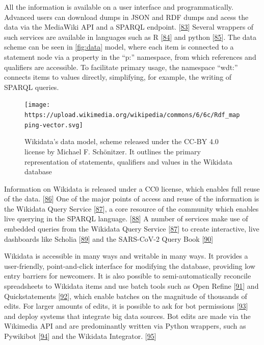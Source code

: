 All the information is available on a user interface and programmatically.
Advanced users can download dumps in JSON and RDF dumps and acess the data via the MediaWiki API and a SPARQL endpoint. {[}\protect\hyperlink{ref-4wSLyAPr}{83}{]}
Several wrappers of such services are available in languages such as R {[}\protect\hyperlink{ref-1HghnypzG}{84}{]} and python {[}\protect\hyperlink{ref-VKWfrtR1}{85}{]}.
The data scheme can be seen in \ref{fig:data} model, where each item is connected to a statement node via a property in the ``p:'' namespace, from which references and qualifiers are accessible.
To facilitate primary usage, the namespace ``wdt:'' connects items to values directly, simplifying, for example, the writing of SPARQL queries.

\begin{figure}
\hypertarget{fig:datamodel}{%
\centering
\texttt{[image: https://upload.wikimedia.org/wikipedia/commons/6/6c/Rdf\_mapping-vector.svg]}
\caption{Wikidata's data model, scheme released under the CC-BY 4.0 license by Michael F. Schönitzer. It outlines the primary representation of statements, qualifiers and values in the Wikidata database}\label{fig:datamodel}
}
\end{figure}

Information on Wikidata is released under a CC0 license, which enables full reuse of the data. {[}\protect\hyperlink{ref-tQIJPG4k}{86}{]}
One of the major points of access and reuse of the information is the Wikidata Query Service {[}\protect\hyperlink{ref-2wDsXBwd}{87}{]}, a core resource of the community which enables live querying in the SPARQL language. {[}\protect\hyperlink{ref-t66jYhqe}{88}{]}
A number of services make use of embedded queries from the Wikidata Query Service {[}\protect\hyperlink{ref-2wDsXBwd}{87}{]} to create interactive, live dashboards like Scholia {[}\protect\hyperlink{ref-17P4zruFZ}{89}{]} and the SARS-CoV-2 Query Book {[}\protect\hyperlink{ref-guMp3q1V}{90}{]}

Wikidata is accessible in many ways and writable in many ways.
It provides a user-friendly, point-and-click interface for modifying the database, providing low entry barriers for newcomers.
It is also possible to semi-automatically reconcile spreadsheets to Wikidata items and use batch tools such as Open Refine {[}\protect\hyperlink{ref-17rRjL1Xj}{91}{]} and Quickstatements {[}\protect\hyperlink{ref-K6ggpwRg}{92}{]}, which enable batches on the magnitude of thousands of edits.
For larger amounts of edits, it is possible to ask for bot permissions {[}\protect\hyperlink{ref-sSH04fxa}{93}{]} and deploy systems that integrate big data sources.
Bot edits are made via the Wikimedia API and are predominantly written via Python wrappers, such as Pywikibot {[}\protect\hyperlink{ref-5K5MfnVl}{94}{]} and the Wikidata Integrator. {[}\protect\hyperlink{ref-qDI8I4IJ}{95}{]}

